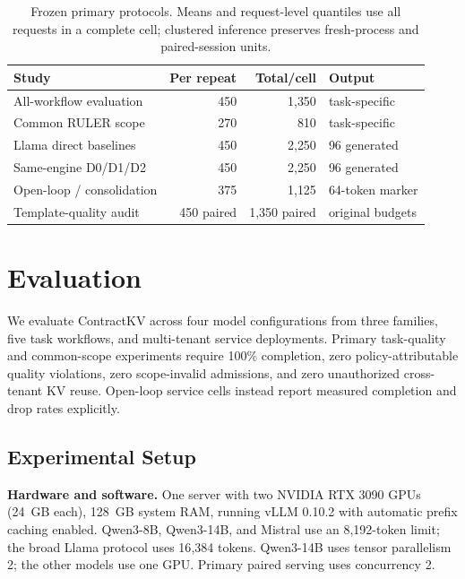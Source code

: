 \documentclass[journal]{IEEEtran}
\begin{document}
\begin{table}[t]
\centering
\caption{Frozen primary protocols. Means and request-level quantiles use all requests in a complete cell; clustered inference preserves fresh-process and paired-session units.}
\label{tab:protocols}
\scriptsize
\begin{tabular}{@{}lrrl@{}}
\toprule
\textbf{Study} & \textbf{Per repeat} & \textbf{Total/cell} & \textbf{Output} \\
\midrule
All-workflow evaluation & 450 & 1{,}350 & task-specific \\
Common RULER scope & 270 & 810 & task-specific \\
Llama direct baselines & 450 & 2{,}250 & 96 generated \\
Same-engine D0/D1/D2 & 450 & 2{,}250 & 96 generated \\
Open-loop / consolidation & 375 & 1{,}125 & 64-token marker \\
Template-quality audit & 450 paired & 1{,}350 paired & original budgets \\
\bottomrule
\end{tabular}
\end{table}

\section{Evaluation}
\label{sec:evaluation}

We evaluate ContractKV across four model configurations from three families, five task workflows, and multi-tenant service deployments. Primary task-quality and common-scope experiments require 100\% completion, zero policy-attributable quality violations, zero scope-invalid admissions, and zero unauthorized cross-tenant KV reuse. Open-loop service cells instead report measured completion and drop rates explicitly.

\subsection{Experimental Setup}
\label{sec:setup}

\noindent\textbf{Hardware and software.}
One server with two NVIDIA RTX 3090 GPUs (24~GB each), 128~GB system RAM, running vLLM 0.10.2 with automatic prefix caching enabled. Qwen3-8B, Qwen3-14B, and Mistral use an 8{,}192-token limit; the broad Llama protocol uses 16{,}384 tokens. Qwen3-14B uses tensor parallelism 2; the other models use one GPU. Primary paired serving uses concurrency 2.
\end{document}
